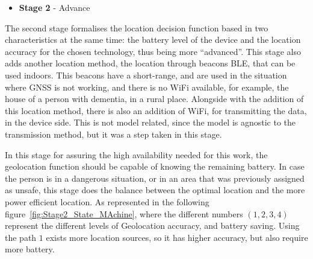 \begin{itemize}
\item \textbf{Stage 2} - Advance
\end{itemize}


The second stage formalises the location decision
function based in two characteristics at the same time: the
battery level of the device and the location accuracy for the
chosen technology, thus being more “advanced”. 
This stage also adds another location method, the location through beacons BLE, that can be used indoors. This beacons have a short-range, and are used in the situation where GNSS is not working, and there is no WiFi available, for example, the house of a person with dementia, in a rural place. 
Alongside with the addition of this location method, there is also an addition of WiFi, for transmitting the data, in the device side. This is not model related, since the model is agnostic to the transmission method, but it was a step taken in this stage.

In this stage for assuring the high availability needed for this work, the geolocation function should be capable of
knowing the remaining battery. In case the person is in a dangerous situation, or in an area that was previously assigned as unsafe, this stage does the balance between the optimal location and the more power efficient location.
As represented in the following figure~\ref{fig:Stage2_State_MAchine}, where the different numbers $(1, 2, 3, 4)$ represent the different levels of Geolocation accuracy, and battery saving. Using the path $1$ exists more location sources, so it has higher accuracy, but also require more battery. 


